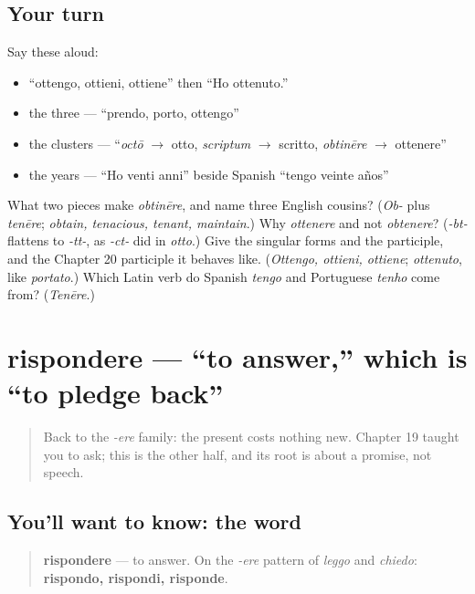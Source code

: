 \subsection*{Your turn}
Say these aloud:

\begin{itemize}
\raggedright
  \item \textquotedblleft{}ottengo, ottieni, ottiene\textquotedblright{} then \textquotedblleft{}Ho ottenuto.\textquotedblright{}
  \item the three — \textquotedblleft{}prendo, porto, ottengo\textquotedblright{}
  \item the clusters — \textquotedblleft{}\emph{octō} $\to$ otto, \emph{scriptum} $\to$ scritto, \emph{obtinēre} $\to$ ottenere\textquotedblright{}
  \item the years — \textquotedblleft{}Ho venti anni\textquotedblright{} beside Spanish \textquotedblleft{}tengo veinte años\textquotedblright{}
\end{itemize}

\begin{tcolorbox}[breakable,colback=teal!4,colframe=teal!35!black,title={Before you move on}]
What two pieces make \emph{obtinēre}, and name three English cousins? (\emph{Ob-} plus \emph{tenēre}; \emph{obtain, tenacious, tenant, maintain}.) Why \emph{ottenere} and not \emph{obtenere}? (\emph{-bt-} flattens to \emph{-tt-}, as \emph{-ct-} did in \emph{otto}.) Give the singular forms and the participle, and the Chapter 20 participle it behaves like. (\emph{Ottengo, ottieni, ottiene}; \emph{ottenuto}, like \emph{portato}.) Which Latin verb do Spanish \emph{tengo} and Portuguese \emph{tenho} come from? (\emph{Tenēre}.)
\end{tcolorbox}
\section[rispondere]{rispondere — \textquotedblleft{}to answer,\textquotedblright{} which is \textquotedblleft{}to pledge back\textquotedblright{}}

\label{lesson:IT-C21-rispondere}



\begin{quote}
Back to the \emph{-ere} family: the present costs nothing new. Chapter 19 taught you to ask; this is the other half, and its root is about a promise, not speech.
\end{quote}

\subsection*{You'll want to know: the word}
\begin{quote}
\textbf{rispondere} — to answer. On the \emph{-ere} pattern of \emph{leggo} and \emph{chiedo}: \textbf{rispondo, rispondi, risponde}.
\end{quote}

